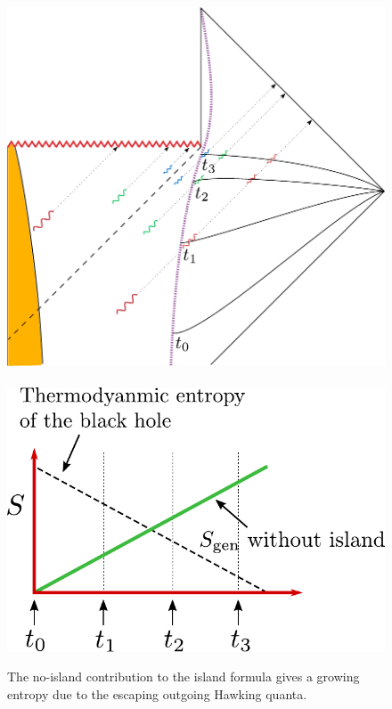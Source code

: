 \begin{figure}[t]
\begin{center}
\includegraphics[scale=0.4]{figures/radnoisland.pdf}
 \ \ \ \ \ \  \includegraphics[scale=0.6]{figures/radnoislandcurve.pdf}
\caption{The no-island contribution to the island formula gives a growing entropy due to the escaping outgoing Hawking quanta.  }
\label{radnoisland}
\end{center}
\end{figure}



